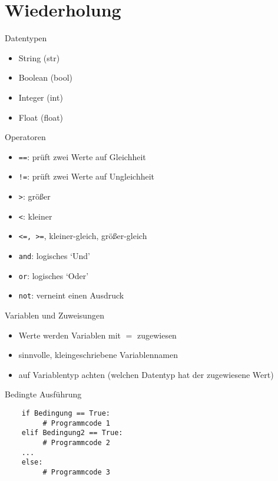 \section{Wiederholung}

\begin{frame}[fragile]{Datentypen}
	\begin{itemize}
		\item String (str)
		\item Boolean (bool)
		\item Integer (int)
		\item Float (float)
	\end{itemize}
\end{frame}

\begin{frame}[fragile]{Operatoren}
	\begin{itemize}
		\item \texttt{==}: prüft zwei Werte auf Gleichheit
		\item \texttt{!=}: prüft zwei Werte auf Ungleichheit
		\item \texttt{>}: größer
		\item \texttt{<}: kleiner 
		\item \texttt{<=, >=}, kleiner-gleich, größer-gleich
		\item \texttt{and}: logisches `Und'
		\item \texttt{or}: logisches `Oder'
		\item \texttt{not}: verneint einen Ausdruck
	\end{itemize}
\end{frame}


\begin{frame}[fragile]{Variablen und Zuweisungen}
	\begin{itemize}
		\item Werte werden Variablen mit $=$ zugewiesen
		\item sinnvolle, kleingeschriebene Variablennamen
		\item auf Variablentyp achten (welchen Datentyp hat der zugewiesene Wert)
	\end{itemize}
\end{frame}

\begin{frame}[fragile]{Bedingte Ausführung}
	\begin{lstlisting}
	if Bedingung == True:
	     # Programmcode 1
	elif Bedingung2 == True:
	     # Programmcode 2
	...
	else:
	     # Programmcode 3
	\end{lstlisting}
\end{frame}

